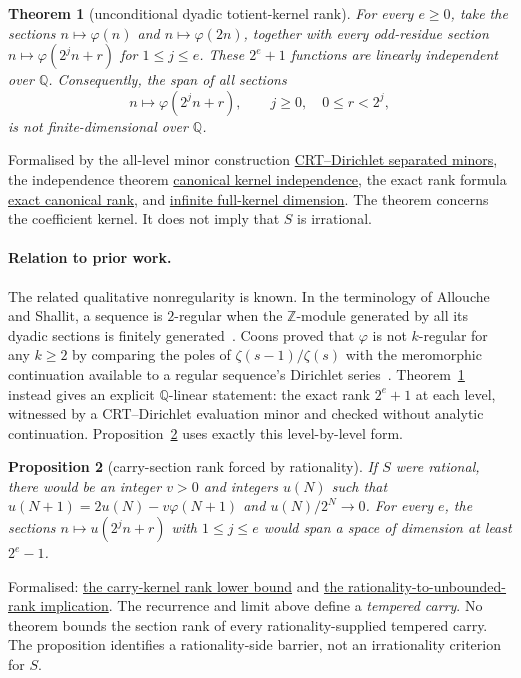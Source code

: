\documentclass[11pt]{article}
\newcommand{\commit}{ebc98ee71f6819bd9fe344a0bb343542c604e533}
\newcommand{\repobase}{https://github.com/wcook04/plectis-lean-erdos249-257/blob/\commit}
\newcommand{\PK}{Erdos249257}
\newcommand{\lword}[4]{\href{\repobase/\PK/#1\#L#2}{#4}}
\newtheorem{theorem}{Theorem}[section]
\newtheorem{proposition}[theorem]{Proposition}
\theoremstyle{definition}
\theoremstyle{remark}
\newcommand{\Z}{\mathbb{Z}}
\newcommand{\Q}{\mathbb{Q}}
\newcommand{\ph}{\varphi}
\begin{document}
{\begin{theorem}[unconditional dyadic totient-kernel rank]
\label{res:dyadictotient}
For every $e\geq0$, take the sections $n\mapsto\ph(n)$ and
$n\mapsto\ph(2n)$, together with every odd-residue section
$n\mapsto\ph(2^jn+r)$ for $1\leq j\leq e$.  These $2^e+1$ functions are
linearly independent over $\Q$.
Consequently, the span of all sections
\[
 n\longmapsto \ph(2^j n+r),\qquad j\geq0,\quad 0\leq r<2^j,
\]
is not finite-dimensional over $\Q$.
\end{theorem}
\noindent Formalised by the all-level minor construction
\lword{TotientMahlerDefect.lean}{847}{exists_separatedMinorCertificate_totientAffineOddFamily}{CRT--Dirichlet separated minors},
the independence theorem
\lword{TotientMahlerDefect.lean}{900}{linearIndependent_canonicalTotientKernelFamily}{canonical kernel independence},
the exact rank formula
\lword{TotientMahlerDefect.lean}{954}{finrank_canonicalTotientKernel_eq}{exact canonical rank},
and
\lword{TotientMahlerDefect.lean}{1014}{not_finiteDimensional_span_fullTotientKernel}{infinite full-kernel dimension}.
The theorem concerns the coefficient kernel.  It does not imply that $S$ is
irrational.

\paragraph{Relation to prior work.}
The related qualitative nonregularity is known.  In the terminology of
Allouche and Shallit, a sequence is $2$-regular when the $\Z$-module generated
by all its dyadic sections is finitely generated~\cite[Chapter~16]{alloucheshallit}.
Coons proved that $\ph$ is not $k$-regular for any $k\geq2$ by comparing the
poles of $\zeta(s-1)/\zeta(s)$ with the meromorphic continuation available to
a regular sequence's Dirichlet series~\cite[Theorem~3.2]{coons2010}.
Theorem~\ref{res:dyadictotient} instead gives an explicit $\Q$-linear statement:
the exact rank $2^e+1$ at each level, witnessed by a CRT--Dirichlet evaluation
minor and checked without analytic continuation.
Proposition~\ref{res:carryrank} uses exactly this level-by-level form.

\begin{proposition}[carry-section rank forced by rationality]\label{res:carryrank}
If $S$ were rational, there would be an integer $v>0$ and integers $u(N)$ such
that $u(N+1)=2u(N)-v\ph(N+1)$ and $u(N)/2^N\to0$.  For every $e$, the
sections $n\mapsto u(2^jn+r)$ with
$1\leq j\leq e$ would span a space of dimension at least $2^e-1$.
\end{proposition}
\noindent Formalised:
\lword{TotientCarryKernelRigidity.lean}{211}{finrank_canonicalCarryKernel_ge_of_linearIndependent}{the carry-kernel rank lower bound}
and
\lword{TotientCarryKernelRigidity.lean}{284}{not_irrational_totientSeries_implies_unbounded_carryRank_unconditional}{the rationality-to-unbounded-rank implication}.
The recurrence and limit above define a \emph{tempered carry}.  No theorem
bounds the section rank of every rationality-supplied tempered carry.  The
proposition identifies a rationality-side barrier, not an irrationality
criterion for $S$.

}
\end{document}
